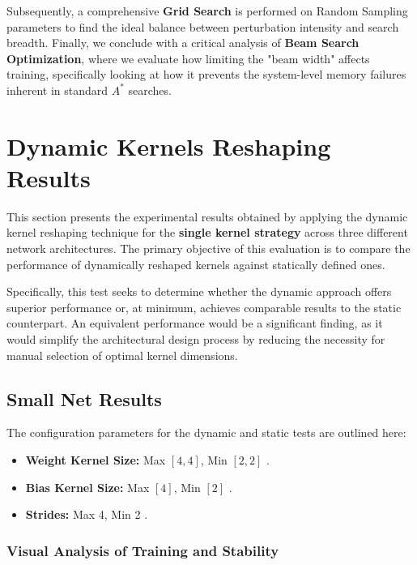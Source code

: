 Subsequently, a comprehensive \textbf{Grid Search} is performed on Random Sampling parameters to find the ideal balance between perturbation intensity and search breadth. Finally, we conclude with a critical analysis of \textbf{Beam Search Optimization}, where we evaluate how limiting the "beam width" affects training, specifically looking at how it prevents the system-level memory failures inherent in standard $A^*$ searches.


\newpage


\section{Dynamic Kernels Reshaping Results}

This section presents the experimental results obtained by applying the dynamic kernel reshaping technique for the \textbf{single kernel strategy} across three different network architectures. The primary objective of this evaluation is to compare the performance of dynamically reshaped kernels against statically defined ones. 

Specifically, this test seeks to determine whether the dynamic approach offers superior performance or, at minimum, achieves comparable results to the static counterpart. An equivalent performance would be a significant finding, as it would simplify the architectural design process by reducing the necessity for manual selection of optimal kernel dimensions.

\subsection{Small Net Results}

The configuration parameters for the dynamic and static tests are outlined here:

\begin{itemize}
    \item \textbf{Weight Kernel Size:} Max $[4,4]$, Min $[2,2]$ .
    \item \textbf{Bias Kernel Size:} Max $[4]$, Min $[2]$ .
    \item \textbf{Strides:} Max 4, Min 2 .
    
\end{itemize}

\subsubsection{Visual Analysis of Training and Stability}

